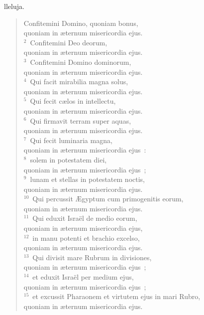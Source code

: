 \bchapter
{}lleluja. \begin{flushleft}\begin{verse}\vspace{6pt}Confitemini Domino, quoniam bonus,\\ quoniam in \ae ternum misericordia ejus.\\
${}^{2}$~Confitemini Deo deorum,\\ quoniam in \ae ternum misericordia ejus.\\
${}^{3}$~Confitemini Domino dominorum,\\ quoniam in \ae ternum misericordia ejus.\\
${}^{4}$~Qui facit mirabilia magna solus,\\ quoniam in \ae ternum misericordia ejus.\\
${}^{5}$~Qui fecit c\ae los in intellectu,\\ quoniam in \ae ternum misericordia ejus.\\
${}^{6}$~Qui firmavit terram super aquas,\\ quoniam in \ae ternum misericordia ejus.\\
${}^{7}$~Qui fecit luminaria magna,\\ quoniam in \ae ternum misericordia ejus~:\\
${}^{8}$~solem in potestatem diei,\\ quoniam in \ae ternum misericordia ejus~;\\
${}^{9}$~lunam et stellas in potestatem noctis,\\ quoniam in \ae ternum misericordia ejus.\\
${}^{10}$~Qui percussit \AE gyptum cum primogenitis eorum,\\ quoniam in \ae ternum misericordia ejus.\\
${}^{11}$~Qui eduxit Isra\"el de medio eorum,\\ quoniam in \ae ternum misericordia ejus,\\
${}^{12}$~in manu potenti et brachio excelso,\\ quoniam in \ae ternum misericordia ejus.\\
${}^{13}$~Qui divisit mare Rubrum in divisiones,\\ quoniam in \ae ternum misericordia ejus~;\\
${}^{14}$~et eduxit Isra\"el per medium ejus,\\ quoniam in \ae ternum misericordia ejus~;\\
${}^{15}$~et excussit Pharaonem et virtutem ejus in mari Rubro,\\ quoniam in \ae ternum misericordia ejus.\\

\end{verse}
\end{flushleft}
